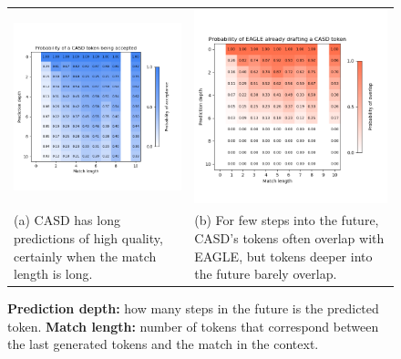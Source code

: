 \begin{landscape}

\begin{figure}
  \centering
  \captionsetup{width=0.55\linewidth}
  \begin{tabular}{@{}l@{}@{}l@{}}
    \includegraphics[width=.5\linewidth]{fig/prob_casd_accept.png} & \includegraphics[width=.5\linewidth]{fig/prob_casd_eagle_overlap.png} \\[-1cm]
    \hspace{1cm} \parbox{.32\linewidth}{\small (a) CASD has long predictions of high quality, certainly when the match length is long. \newline} 
    & \hspace{1cm} \parbox{.32\linewidth}{\small (b) For few steps into the future, CASD's tokens often overlap with EAGLE, but tokens deeper into the future barely overlap.}
  \end{tabular}
  \vspace{0.2cm}
  \caption{
    \textbf{Prediction depth:} how many steps in the future is the predicted token.
    \textbf{Match length:} number of tokens that correspond between the last generated tokens and the match in the context. \\
  }
  \label{fig:prob_casd_accept}
  \label{fig:prob_casd_eagle_overlap}
\end{figure}

\end{landscape}